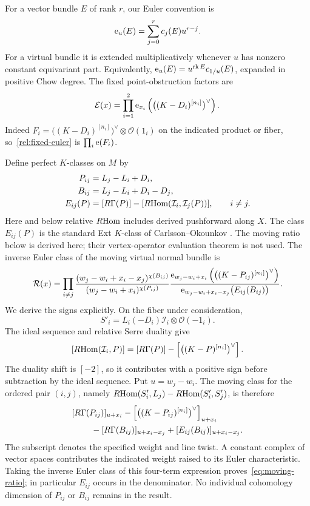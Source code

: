 For a vector bundle $E$ of rank $r$, our Euler convention is
\[
 \operatorname{e}_u(E)=\sum_{j=0}^r c_j(E)u^{r-j}.
\]
For a virtual bundle it is extended multiplicatively whenever $u$ has
nonzero constant equivariant part.  Equivalently,
$\operatorname{e}_u(E)=u^{\operatorname{rk} E}c_{1/u}(E)$, expanded in positive Chow degree.
The fixed point-obstruction factors are
\begin{equation}
 \mathcal E(x)=\prod_{i=1}^2
 \operatorname{e}_{x_i}\left(\bigl((K-D_i)^{[n_i]}\bigr)^\vee\right).
 \label{rel:fixed-euler}
\end{equation}
Indeed $F_i=\bigl((K-D_i)^{[n_i]}\bigr)^\vee\otimes\mathcal O(1_i)$
on the indicated product or fiber, so~\eqref{rel:fixed-euler} is
$\prod_i\operatorname{e}(F_i)$.

Define perfect $K$-classes on $M$ by
\[
 \begin{split}
 P_{ij}&=L_j-L_i+D_i,\\
 B_{ij}&=L_j-L_i+D_i-D_j,\\
 E_{ij}(P)&=[R\Gamma(P)]-
 [R\!\operatorname{Hom}(\mathcal I_i,\mathcal I_j(P))],
 \qquad i\ne j.
 \end{split}
\]
Here and below relative $R\!\operatorname{Hom}$ includes derived pushforward along $X$.
The class $E_{ij}(P)$ is the standard Ext $K$-class of Carlsson--Okounkov
\cite[Section~1.2, equation~(2)]{CarlssonOkounkov}.  The moving ratio below
is derived here; their vertex-operator evaluation theorem is not used.
The inverse Euler class of the moving virtual normal bundle is
\begin{equation}
 \mathcal R(x)=\prod_{i\ne j}
 \frac{(w_j-w_i+x_i-x_j)^{\chi(B_{ij})}}
      {(w_j-w_i+x_i)^{\chi(P_{ij})}}
 \frac{\operatorname{e}_{w_j-w_i+x_i}
   \left(\bigl((K-P_{ij})^{[n_i]}\bigr)^\vee\right)}
      {\operatorname{e}_{w_j-w_i+x_i-x_j}\bigl(E_{ij}(B_{ij})\bigr)}.
 \label{eq:moving-ratio}
\end{equation}
We derive the signs explicitly.  On the fiber under consideration,
\[
 S'_i=L_i(-D_i)\mathcal I_i\otimes\mathcal O(-1_i).
\]
The ideal sequence and relative Serre duality give
\[
 [R\!\operatorname{Hom}(\mathcal I_i,P)]
 =[R\Gamma(P)]-
 \left[\bigl((K-P)^{[n_i]}\bigr)^\vee\right].
\]
The duality shift is $[-2]$, so it contributes with a positive sign
before subtraction by the ideal sequence.  Put $u=w_j-w_i$.  The moving
class for the ordered pair $(i,j)$, namely
$R\!\operatorname{Hom}(S'_i,L_j)-R\!\operatorname{Hom}(S'_i,S'_j)$, is therefore
\begin{align*}
 &[R\Gamma(P_{ij})]_{u+x_i}
 -\left[\bigl((K-P_{ij})^{[n_i]}\bigr)^\vee\right]_{u+x_i}\\
 &\hspace{8mm}-[R\Gamma(B_{ij})]_{u+x_i-x_j}
 +[E_{ij}(B_{ij})]_{u+x_i-x_j}.
\end{align*}
The subscript denotes the specified weight and line twist.  A constant
complex of vector spaces contributes the indicated weight raised to
its Euler characteristic.  Taking the inverse Euler class of this
four-term expression proves~\eqref{eq:moving-ratio}; in particular
$E_{ij}$ occurs in the denominator.  No individual cohomology dimension
of $P_{ij}$ or $B_{ij}$ remains in the result.

